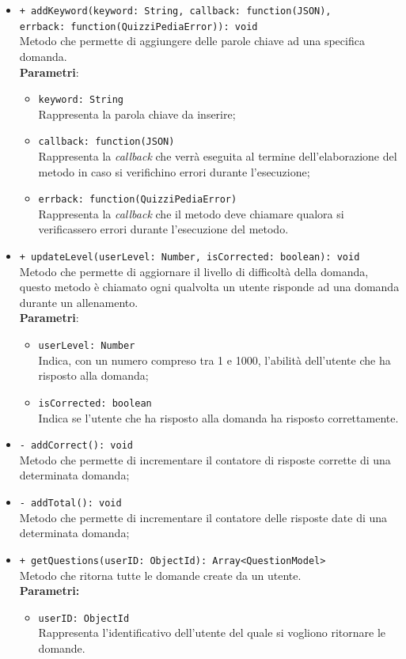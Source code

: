 \begin{itemize}
\begin{itemize}
	\item \texttt{+ addKeyword(keyword: String, callback: function(JSON),\\ errback: function(QuizziPediaError)): void} \\
	Metodo che permette di aggiungere delle parole chiave ad una specifica domanda. \\
		\textbf{Parametri}:
			 \begin{itemize}
			 	\item \texttt{keyword: String} \\
			 	Rappresenta la parola chiave da inserire;
			 	\item \texttt{callback: function(JSON)} \\
			 	Rappresenta la \textit{callback} che verrà eseguita al termine dell'elaborazione del metodo in caso si verifichino errori durante l'esecuzione;
			 	\item \texttt{errback: function(QuizziPediaError)} \\
			 	Rappresenta la \textit{callback} che il metodo deve chiamare qualora si verificassero errori durante l'esecuzione del metodo.
			 \end{itemize}
	\item \texttt{+ updateLevel(userLevel: Number, isCorrected: boolean): void} \\
	Metodo che permette di aggiornare il livello di difficoltà della domanda, questo metodo è chiamato ogni qualvolta un utente risponde ad una domanda durante un allenamento.\\
		\textbf{Parametri}:
			\begin{itemize}
				\item \texttt{userLevel: Number} \\
				Indica, con un numero compreso tra 1 e 1000, l'abilità dell'utente che ha risposto alla domanda;
				\item \texttt{isCorrected: boolean} \\
				Indica se l'utente che ha risposto alla domanda ha risposto correttamente.
			\end{itemize}  
	\item \texttt{- addCorrect(): void} \\
	Metodo che permette di incrementare il contatore di risposte corrette di una determinata domanda;
	\item \texttt{- addTotal(): void} \\
	Metodo che permette di incrementare il contatore delle risposte date di una determinata domanda;
	\item \texttt{+ getQuestions(userID: ObjectId): Array<QuestionModel>}\\
	Metodo che ritorna tutte le domande create da un utente.\\
	\textbf{Parametri:}
	\begin{itemize}
		\item \texttt{userID: ObjectId}\\
		Rappresenta l'identificativo dell'utente del quale si vogliono ritornare le domande.
	\end{itemize}
	\end{itemize}
\end{itemize}
